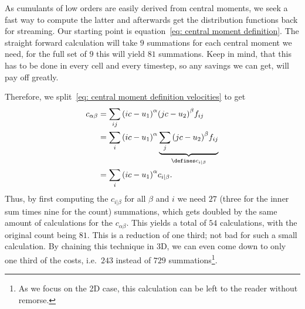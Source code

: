 
As cumulants of low orders are easily derived from central moments, we seek a fast way to compute the latter and afterwards get the distribution functions back for streaming.
Our starting point is equation~\eqref{eq: central moment definition}.
The straight forward calculation will take $9$ summations for each central moment we need, for the full set of $9$ this will yield $81$ summations.
Keep in mind, that this has to be done in every cell and every timestep, so any savings we can get, will pay off greatly.

Therefore, we split~\eqref{eq: central moment definition velocities} to get
\begin{equation}
  \begin{aligned}
    c_{\alpha\beta}
    & = \sum_{ij} {\left(ic-u_1\right)}^\alpha {\left(jc-u_2\right)}^\beta f_{ij} \\
    & = \sum_{i} {\left(ic-u_1\right)}^\alpha \underbrace{\sum_{j} {\left(jc-u_2\right)}^\beta f_{ij}}_{\defines c_{i|\beta}} \\
    & = \sum_{i} {\left(ic-u_1\right)}^\alpha c_{i|\beta}.
  \end{aligned}
\end{equation}
Thus, by first computing the $c_{i|\beta}$ for all $\beta$ and $i$ we need $27$ (three for the inner sum times nine for the count) summations, which gets doubled by the same amount of calculations for the $c_{\alpha\beta}$.
This yields a total of $54$ calculations, with the original count being $81$.
This is a reduction of one third; not bad for such a small calculation.
By chaining this technique in 3D, we can even come down to only one third of the costs, i.e.\ $243$ instead of $729$ summations\footnote{As we focus on the 2D case, this calculation can be left to the reader without remorse.}.

